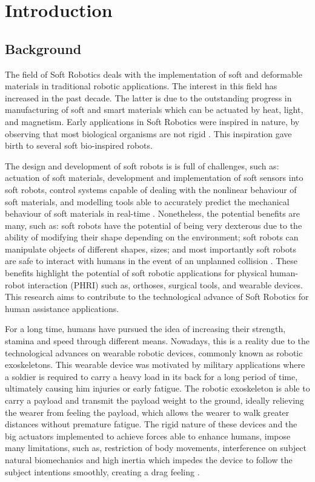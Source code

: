 \chapter{Introduction} \label{ch1:introduction}
\section{Background}

The field of Soft Robotics deals with the implementation of soft and deformable materials in traditional robotic applications. The interest in this field has increased in the past decade. The latter is due to the outstanding progress in manufacturing of soft and smart materials which can be actuated by heat, light, and magnetism. Early applications in Soft Robotics were inspired in nature, by observing that most biological organisms are not rigid \cite{kim2013soft}. This inspiration gave birth to several soft bio-inspired robots.

The design and development of soft robots is is full of challenges, such as:  actuation of soft materials, development and implementation of soft sensors into soft robots, control systems capable of dealing with the nonlinear behaviour of soft materials, and modelling tools able to accurately predict the mechanical behaviour of soft materials in real-time \cite{laschi2016soft,trivedi2008soft}. Nonetheless, the potential benefits are many, such as: soft robots have the potential of being very dexterous due to the ability of modifying their shape depending on the environment; soft robots can manipulate objects of different shapes, sizes; and most importantly soft robots are safe to interact with humans in the event of an unplanned collision \cite{iida2011soft}. These benefits highlight the potential of soft robotic applications for physical human-robot interaction (PHRI) such as, orthoses, surgical tools, and wearable devices. This research aims to contribute to the technological advance of Soft Robotics for human assistance applications.

For a long time, humans have pursued the idea of increasing their strength, stamina and speed through different means. Nowadays, this is a reality due to the technological advances on wearable robotic devices, commonly known as robotic exoskeletons. This wearable device was motivated by military applications where a soldier is required to carry a heavy load in its back for a long period of time, ultimately causing him injuries or early fatigue. The robotic exoskeleton is able to carry a payload and transmit the payload weight to the ground, ideally relieving the wearer from feeling the payload, which allows the wearer to walk greater distances without premature fatigue. The rigid nature of these devices and the big actuators implemented to achieve forces able to enhance humans, impose many limitations, such as, restriction of body movements, interference on subject natural biomechanics and high inertia which impedes the device to follow the subject intentions smoothly, creating a drag feeling \cite{asbeck2014stronger}.

